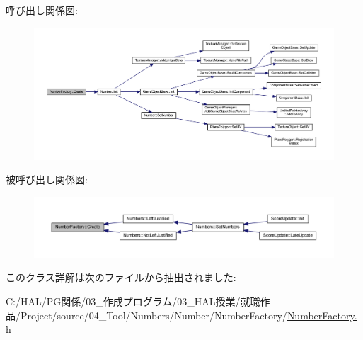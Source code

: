 呼び出し関係図\+:\nopagebreak
\begin{figure}[H]
\begin{center}
\leavevmode
\includegraphics[width=350pt]{class_number_factory_aace5458332c982b3f12265abaf5a3308_cgraph}
\end{center}
\end{figure}
被呼び出し関係図\+:\nopagebreak
\begin{figure}[H]
\begin{center}
\leavevmode
\includegraphics[width=350pt]{class_number_factory_aace5458332c982b3f12265abaf5a3308_icgraph}
\end{center}
\end{figure}


このクラス詳解は次のファイルから抽出されました\+:\begin{DoxyCompactItemize}
\item 
C\+:/\+H\+A\+L/\+P\+G関係/03\+\_\+作成プログラム/03\+\_\+\+H\+A\+L授業/就職作品/\+Project/source/04\+\_\+\+Tool/\+Numbers/\+Number/\+Number\+Factory/\mbox{\hyperlink{_number_factory_8h}{Number\+Factory.\+h}}\end{DoxyCompactItemize}

